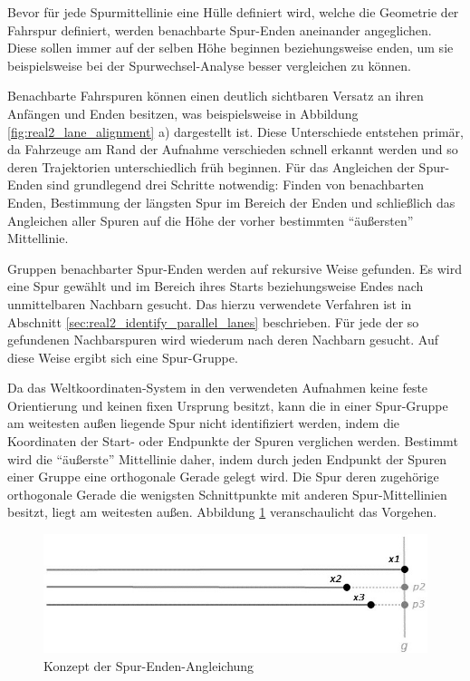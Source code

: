 Bevor für jede Spurmittellinie eine Hülle definiert wird, welche die Geometrie der Fahrspur definiert,
werden benachbarte Spur-Enden aneinander angeglichen. Diese sollen immer auf der selben Höhe beginnen
beziehungsweise enden, um sie beispielsweise bei der Spurwechsel-Analyse besser vergleichen zu können.

Benachbarte Fahrspuren können einen deutlich sichtbaren Versatz an ihren Anfängen
und Enden besitzen, was beispielsweise in Abbildung \ref{fig:real2_lane_alignment} a) dargestellt ist. Diese Unterschiede entstehen
primär, da Fahrzeuge am Rand der Aufnahme verschieden schnell erkannt werden und so deren Trajektorien
unterschiedlich früh beginnen. Für das Angleichen der Spur-Enden sind grundlegend drei Schritte notwendig:
Finden von benachbarten Enden, Bestimmung der längsten Spur im Bereich der Enden und schließlich das
Angleichen aller Spuren auf die Höhe der vorher bestimmten ``äußersten'' Mittellinie.

Gruppen benachbarter Spur-Enden werden auf rekursive Weise gefunden. Es wird eine Spur gewählt und im
Bereich ihres Starts beziehungsweise Endes nach unmittelbaren Nachbarn gesucht. Das hierzu verwendete
Verfahren ist in Abschnitt \ref{sec:real2_identify_parallel_lanes} beschrieben. Für jede der so gefundenen
Nachbarspuren wird wiederum nach deren Nachbarn gesucht. Auf diese Weise ergibt sich eine Spur-Gruppe.

Da das Weltkoordinaten-System in den verwendeten Aufnahmen keine feste Orientierung und keinen fixen Ursprung besitzt,
kann die in einer Spur-Gruppe am weitesten außen liegende Spur nicht identifiziert werden, indem die
Koordinaten der Start- oder Endpunkte der Spuren verglichen werden.
Bestimmt wird die ``äußerste'' Mittellinie daher, indem durch jeden Endpunkt der Spuren einer Gruppe
eine orthogonale Gerade gelegt wird. Die Spur deren zugehörige orthogonale Gerade die wenigsten Schnittpunkte
mit anderen Spur-Mittellinien besitzt, liegt am weitesten außen. Abbildung \ref{fig:real2_lane_alignment_concept}
veranschaulicht das Vorgehen.

\begin{figure}[H]
    \centering
    \includegraphics[width=0.5\linewidth]{../resources/img/umsetzung/U2/LaneAlignment_concept}
    \caption{Konzept der Spur-Enden-Angleichung}
    \label{fig:real2_lane_alignment_concept}
\end{figure}


